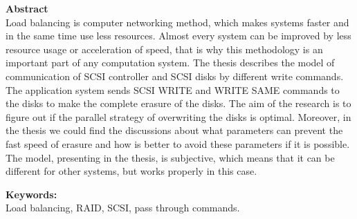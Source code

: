 {\bf Abstract}\\



Load balancing is computer networking method, which makes systems faster and in the same time use less resources. Almost every system can be improved by less resource usage or acceleration of speed, that is why this methodology is an important part of any computation system. The thesis describes the model of communication of SCSI controller and SCSI disks by different write commands. The application system sends SCSI WRITE and WRITE SAME commands to the disks to make the complete erasure of the disks. The aim of the research is to figure out if the parallel strategy of overwriting the disks is optimal. Moreover, in the thesis we could find the discussions about what parameters can prevent the fast speed of erasure and how is better to avoid these parameters if it is possible. The model, presenting in the thesis, is subjective, which means that it can be different for other systems, but works properly in this case.





{\bf Keywords:}\\
Load balancing, RAID, SCSI, pass through commands.
